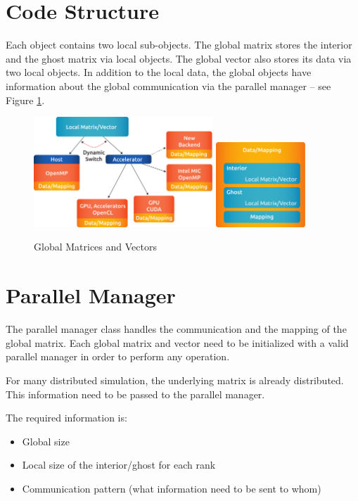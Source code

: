 \section{Code Structure}

Each object contains two local sub-objects. The global matrix stores the interior and the ghost matrix via local objects. The global vector also stores its data via two local objects. In addition to the local data, the global objects have information about the global communication via the parallel manager  -- see Figure \ref{paralution-global}.

\begin{figure}[!ht]
\centering
\includegraphics[width=0.6\textwidth]{./fig/global_obj.pdf}
\hspace{7mm}
\includegraphics[width=0.3\textwidth]{./fig/global_data.pdf}
\caption{Global Matrices and Vectors}
\label{paralution-global}
\end{figure}

\section{Parallel Manager}

The parallel manager class handles the communication and the mapping of the global matrix. Each global matrix and vector need to be initialized with a valid parallel manager in order to perform any operation.

For many distributed simulation, the underlying matrix is already distributed. This information need to be passed to the parallel manager.

The required information is:
\begin{itemize}
  \item Global size
  \item Local size of the interior/ghost for each rank
  \item Communication pattern (what information need to be sent to whom)
\end{itemize}


